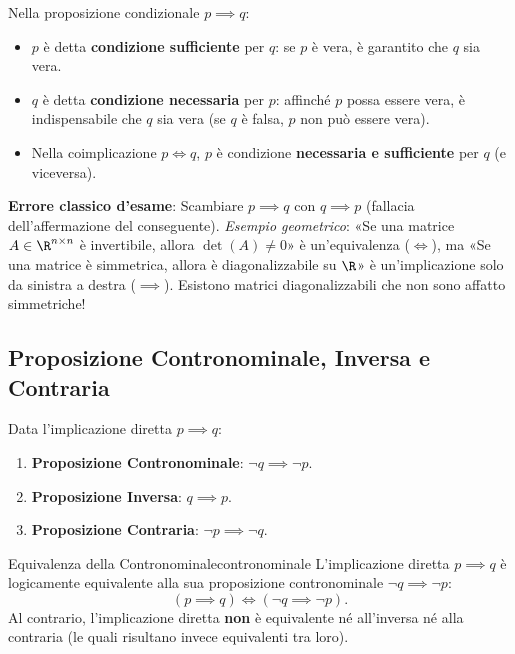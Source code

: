 \begin{esame}
Nella proposizione condizionale $p \implies q$:
\begin{itemize}
    \item $p$ è detta \textbf{condizione sufficiente} per $q$: se $p$ è vera, è garantito che $q$ sia vera.
    \item $q$ è detta \textbf{condizione necessaria} per $p$: affinché $p$ possa essere vera, è indispensabile che $q$ sia vera (se $q$ è falsa, $p$ non può essere vera).
    \item Nella coimplicazione $p \iff q$, $p$ è condizione \textbf{necessaria e sufficiente} per $q$ (e viceversa).
\end{itemize}
\textbf{Errore classico d'esame}: Scambiare $p \implies q$ con $q \implies p$ (fallacia dell'affermazione del conseguente).
\emph{Esempio geometrico}: «Se una matrice $A \in \R^{n \times n}$ è invertibile, allora $\det(A) \neq 0$» è un'equivalenza ($\iff$), ma «Se una matrice è simmetrica, allora è diagonalizzabile su $\R$» è un'implicazione solo da sinistra a destra ($\implies$). Esistono matrici diagonalizzabili che non sono affatto simmetriche!
\end{esame}

\subsection{Proposizione Contronominale, Inversa e Contraria}

Data l'implicazione diretta $p \implies q$:
\begin{enumerate}
    \item \textbf{Proposizione Contronominale}: $\neg q \implies \neg p$.
    \item \textbf{Proposizione Inversa}: $q \implies p$.
    \item \textbf{Proposizione Contraria}: $\neg p \implies \neg q$.
\end{enumerate}

\begin{teorema}{Equivalenza della Contronominale}{contronominale}
L'implicazione diretta $p \implies q$ è logicamente equivalente alla sua proposizione contronominale $\neg q \implies \neg p$:
\begin{equation}
    (p \implies q) \iff (\neg q \implies \neg p).
\end{equation}
Al contrario, l'implicazione diretta \textbf{non} è equivalente né all'inversa né alla contraria (le quali risultano invece equivalenti tra loro).
\end{teorema}

